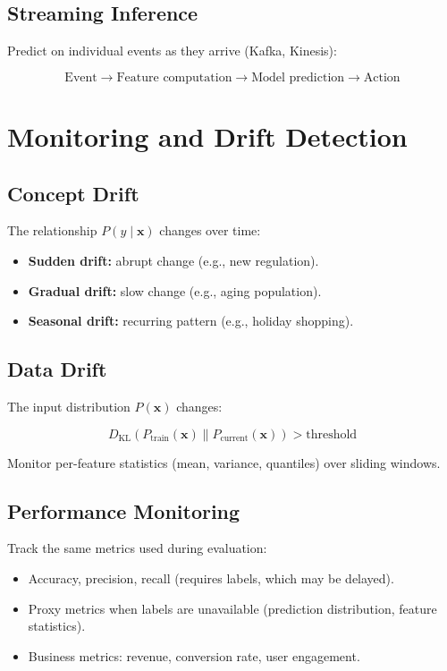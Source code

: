 \subsection{Streaming Inference}

Predict on individual events as they arrive (Kafka, Kinesis):

\[
	\text{Event} \to \text{Feature computation} \to \text{Model prediction} \to \text{Action}
\]

\section{Monitoring and Drift Detection}

\subsection{Concept Drift}

The relationship $P(y \mid \mathbf{x})$ changes over time:

\begin{itemize}
	\item \textbf{Sudden drift:} abrupt change (e.g., new regulation).
	\item \textbf{Gradual drift:} slow change (e.g., aging population).
	\item \textbf{Seasonal drift:} recurring pattern (e.g., holiday shopping).
\end{itemize}

\subsection{Data Drift}

The input distribution $P(\mathbf{x})$ changes:

\[
	D_{\text{KL}}(P_{\text{train}}(\mathbf{x}) \parallel P_{\text{current}}(\mathbf{x})) > \text{threshold}
\]

Monitor per-feature statistics (mean, variance, quantiles) over sliding windows.

\subsection{Performance Monitoring}

Track the same metrics used during evaluation:

\begin{itemize}
	\item Accuracy, precision, recall (requires labels, which may be delayed).
	\item Proxy metrics when labels are unavailable (prediction distribution, feature statistics).
	\item Business metrics: revenue, conversion rate, user engagement.
\end{itemize}

